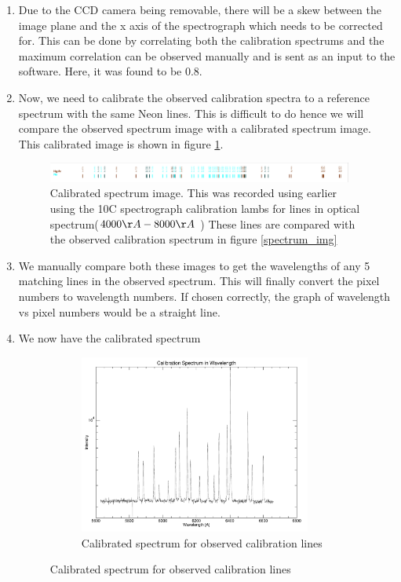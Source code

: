 \documentclass[12pt,a4paper]{article}
\begin{document}
\begin{enumerate}
        \item Due to the CCD camera being removable, there will be a skew between the image plane and the x axis of the spectrograph which needs to be corrected for. This can be done by correlating both the calibration spectrums
              and the maximum correlation can be observed manually and is sent as an input to the software. Here, it was found to be $0.8$.
        \item Now, we need to calibrate the observed calibration spectra to a reference spectrum with the same Neon lines. This is difficult to do hence we will compare
              the observed spectrum image with a calibrated spectrum image. This calibrated image is shown in figure \ref{fig:calibrated_cal_image}.
              \begin{figure}[H]
                \centering
                \includegraphics[width=0.95\textwidth]{Pictures/ReferenceImage.pdf}
                \caption{Calibrated spectrum image. This was recorded using earlier using the 10C spectrograph calibration lambs for lines in optical spectrum($4000\AA-8000\AA$ ) These lines are compared with the observed calibration spectrum in figure \ref{spectrum_img}}
                \label{fig:calibrated_cal_image}
              \end{figure} 
        \item We manually compare both these images to get the wavelengths of any 5 matching lines in the observed spectrum. This will finally convert the pixel numbers to wavelength numbers. If chosen correctly, the graph of wavelength vs pixel numbers would be a straight line.
        \item We now have the calibrated spectrum
              \begin{figure}[H]
                \centering
                \begin{subfigure}{0.49\textwidth}
                  \centering
                  \includegraphics[width=3in]{Pictures/Castor_121sec_2025_2-CalSpectrum.pdf}
                  \caption{Calibrated spectrum for observed calibration lines}
                  \label{fig:calibrated_calspec}
                  

\end{subfigure}
\end{figure}
\end{enumerate}
\end{document}

